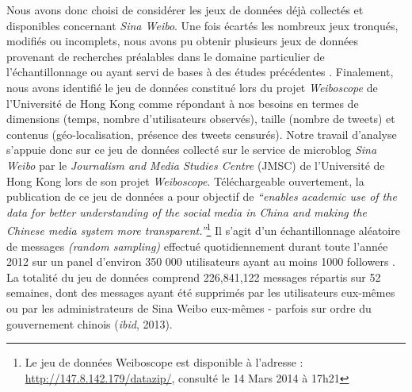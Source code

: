 Nous avons donc choisi de considérer les jeux de données déjà collectés et disponibles concernant \textit{Sina Weibo}. Une fois écartés les nombreux jeux tronqués, modifiés ou incomplets, nous avons pu obtenir plusieurs jeux de données provenant de recherches préalables dans le domaine particulier de l{\textquoteright}échantillonnage \citep{Ding2013} ou ayant servi de bases à des études précédentes \citep{Gao2012}. Finalement, nous avons identifié le jeu de données constitué lors du projet \textit{Weiboscope} de l{\textquoteright}Université de Hong Kong comme répondant à nos besoins en termes de dimensions (temps, nombre d{\textquoteright}utilisateurs observés), taille (nombre de tweets) et contenus (géo-localisation, présence des tweets censurés). Notre travail d{\textquoteright}analyse s{\textquoteright}appuie donc sur ce jeu de données collecté sur le service de microblog \textit{Sina Weibo} par le \textit{Journalism and Media Studies Centre} (JMSC) de l{\textquoteright}Université de Hong Kong lors de son projet \textit{Weiboscope}. Téléchargeable ouvertement, la publication de ce jeu de données a pour objectif de \textit{{\textquotedblleft}enables academic use of the data for better understanding of the social }\textit{media in China and making the Chinese media system more transparent.{\textquotedblright}}\footnote{Le jeu de données Weiboscope est disponible à l{\textquoteright}adresse : \url{http://147.8.142.179/datazip/}, consulté le 14 Mars 2014 à 17h21}\textit{ }Il s{\textquoteright}agit d{\textquoteright}un échantillonnage aléatoire de messages \textit{(random sampling)} effectué quotidiennement durant toute l{\textquoteright}année 2012 sur un panel d{\textquoteright}environ 350 000 utilisateurs ayant au moins 1000 followers \citep{Fu2013}. La totalité du jeu de données comprend 226,841,122 messages répartis sur 52 semaines, dont des messages ayant été supprimés par les utilisateurs eux-m\^emes ou par les administrateurs de Sina Weibo eux-m\^emes - parfois sur ordre du gouvernement chinois (\textit{ibid}, 2013).


